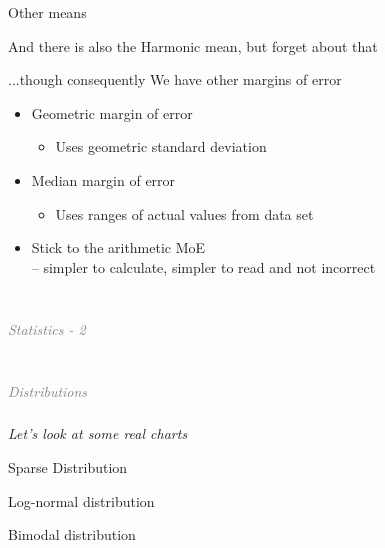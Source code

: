 \documentclass{beamer}
\newcommand{\innersplash}[1]{
  \begin{center}
    \large \textrm{\textit{ #1 } }
  \end{center}
}
\newcommand{\splashslide}[2][{}]{
  \begin{frame}
  \frametitle{#1}
  \innersplash{#2}
  \end{frame}
}
\newcommand{\leadinslide}[2]{
  \splashslide{
     {\fontsize{150}{20}\selectfont{\raisebox{0pt}[90pt][0pt]{\textcolor{light-gray}{#1}}}} \\ \huge \textcolor{gray}{#2}
  }
}
\begin{document}
\begin{frame}{Other means}
  \begin{center}
  And there is also the Harmonic mean, but forget about that
  \end{center}
\end{frame}

\begin{frame}{...though consequently}
We have other margins of error
  \begin{itemize}
  \item Geometric margin of error
    \begin{itemize}
    \item Uses geometric standard deviation
    \end{itemize}
  \item Median margin of error
    \begin{itemize}
    \item Uses ranges of actual values from data set
    \end{itemize}
  \item<2-> Stick to the arithmetic MoE \\ -- simpler to calculate, simpler to read and not incorrect
  \end{itemize}
\end{frame}

\leadinslide{2}{Statistics - 2}

\leadinslide{2-1}{Distributions}

\splashslide{Let's look at some real charts}

\begin{frame}{Sparse Distribution}
\end{frame}

\begin{frame}{Log-normal distribution}
\end{frame}

\begin{frame}{Bimodal distribution}
\end{frame}
\end{document}

